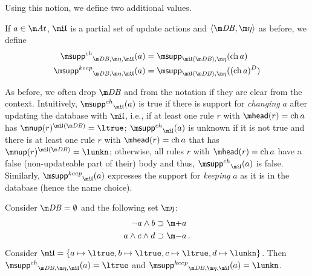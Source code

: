 Using this notion, we define two additional values. 

\begin{definition}
If $a\in \atoms$, $\UUU$ is a partial set of update actions and $\langle \db, \aics\rangle$ as before, we define 
\begin{align*}
 \suppin_{\db,\aics,\UUU}(a) &= \supp_{\UUU(\db), \aics}(\change a)\\
  \suppout_{\db,\aics,\UUU}(a) &= \supp_{\UUU(\db), \aics}((\change a)^D)
\end{align*}
\end{definition}
As before, we often drop $\db$ and \aics from the notation if they are clear from the context. 
Intuitively, 
$\suppin_{\UUU}(a)$ is true if there is support for \emph{changing} $a$ after updating the database with $\UUU$, i.e., if at least one rule $r$ with $\head(r)=\change a$ has $\nup(r)^{\UUU(\db)} = \ltrue$;  
$\suppin_{\UUU}(a)$ is unknown if it is not true and there is at least one rule $r$ with $\head(r)=\change a$ that has $\nup(r)^{\UUU(\db)} = \lunkn$; 
otherwise, all rules $r$ with $\head(r)=\change a$ have a false (non-updateable part of their) body and thus, $\suppin_{\UUU}(a)$ is false. 
Similarly, $\suppout_{\UUU}(a)$ expresses the support for \emph{keeping} $a$ as it is in the database (hence the name choice). 

\begin{example}
 Consider $\db=\emptyset$ and the following set $\aics$:
 \begin{align*}
   \lnot a\land b &\aicrule \add a\\  a \land c\land d &\aicrule\remove a\,.
 \end{align*}
 Consider $\UUU = \{a\mapsto\ltrue,b\mapsto\ltrue, c\mapsto\ltrue, d\mapsto\lunkn\}$. 
 Then  $\suppin_{\db,\aics,\UUU}(a)=\ltrue$ and $\suppout_{\db,\aics,\UUU}(a)=\lunkn$. 
\end{example}





